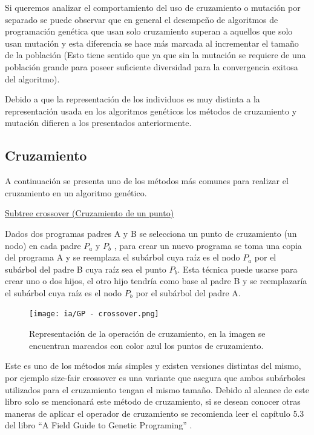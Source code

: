 \documentclass[11pt,fleqn]{book} %
\begin{document}
Si queremos analizar el comportamiento del uso de cruzamiento o mutación por separado se puede observar \cite{luke1997comparison} que en general el desempeño de algoritmos de programación genética que usan solo cruzamiento superan a aquellos que solo usan mutación y esta diferencia se hace más marcada al incrementar el tamaño de la población (Esto tiene sentido que ya que sin la mutación se requiere de una población grande para poseer suficiente diversidad para la convergencia exitosa del algoritmo).

Debido a que la representación de los individuos es muy distinta a la representación usada en los algoritmos genéticos los métodos de cruzamiento y mutación difieren a los presentados anteriormente.

\subsection{Cruzamiento} 

A continuación se presenta uno de los métodos más comunes para realizar el cruzamiento en un algoritmo genético.

\underline{Subtree crossover (Cruzamiento de un punto)}

Dados dos programas padres A y B se selecciona un punto de cruzamiento (un nodo) en cada padre $P_a$ y $P_b$ , para crear un nuevo programa se toma una copia del programa A y se reemplaza el subárbol cuya raíz es el nodo $P_a$ por el subárbol del padre B cuya raíz sea el punto $P_b$.
Esta técnica puede usarse para crear uno o dos hijos, el otro hijo tendría como base al padre B y se reemplazaría el subárbol cuya raíz es el nodo $P_b$ por el subárbol del padre A.

\begin{figure}[ht]
\centering\texttt{[image: ia/GP - crossover.png]}
\caption{Representación de la operación de cruzamiento, en la imagen se encuentran marcados con color azul los puntos de cruzamiento.}
\label{fig:GP - crossover} 
\end{figure}

Este es uno de los métodos más simples y existen versiones distintas del mismo, por ejemplo size-fair crossover es una variante que asegura que ambos subárboles utilizados para el cruzamiento tengan el mismo tamaño. Debido al alcance de este libro solo se mencionará este método de cruzamiento, si se desean conocer otras maneras de aplicar el operador de cruzamiento se recomienda leer el capítulo 5.3 del libro “A Field Guide to Genetic Programing” \cite{polilang08gp}.
\end{document}
